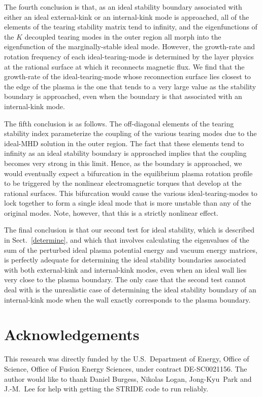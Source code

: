 \documentclass[12pt,prb,aps]{revtex4-1}
\begin{document}
The fourth conclusion is that, as an ideal stability boundary associated with either an ideal external-kink or an internal-kink
mode is approached, all of the elements of the tearing stability matrix tend to infinity, and the eigenfunctions of the $K$ decoupled tearing modes in the outer region 
all morph into the eigenfunction of the marginally-stable ideal mode. However, the growth-rate
and rotation frequency of each ideal-tearing-mode is determined by the layer physics at the rational surface at which it reconnects
magnetic flux. We find that the growth-rate of the ideal-tearing-mode whose reconnection surface lies closest to the edge of the plasma
 is the one that tends to a very large value as the stability boundary is approached, even when the boundary is that associated
with an internal-kink mode. 

The fifth conclusion is as follows. The off-diagonal elements of the tearing stability index parameterize the coupling of the
various tearing modes due to the ideal-MHD solution in the outer region. The fact that these elements tend to infinity as
an ideal stability boundary is approached implies that the coupling becomes very strong in this limit. Hence, as the boundary is
approached, we would eventually expect  a bifurcation in the equilibrium plasma  rotation profile to be triggered  by the nonlinear electromagnetic
torques that develop at the rational surfaces.\cite{am1,bif} This bifurcation would cause the various ideal-tearing-modes to
lock together to form a single ideal mode that is more unstable than any of the original modes. Note, however,  that this is a strictly nonlinear effect. 

The final conclusion is that our second test for ideal stability, which is described in Sect.~\ref{determine}, and which that involves calculating
the eigenvalues of the sum of the perturbed ideal plasma potential energy and vacuum energy matrices,\cite{dcon} is perfectly adequate for
determining the ideal stability boundaries associated with both external-kink and internal-kink modes, even when an ideal wall lies
very close to the plasma boundary. The only case that the second test cannot deal with is the unrealistic case of determining
the ideal stability boundary of an internal-kink mode when the wall exactly corresponds to the plasma boundary. 

\section*{Acknowledgements}
This research was directly funded by the U.S.\ Department of Energy, Office of Science, Office of Fusion Energy Sciences, under  contract DE-SC0021156. 
The author would like to thank Daniel Burgess, Nikolas Logan, Jong-Kyu~Park and J.-M.~Lee for help with getting the STRIDE code to
run reliably. 
\end{document}
